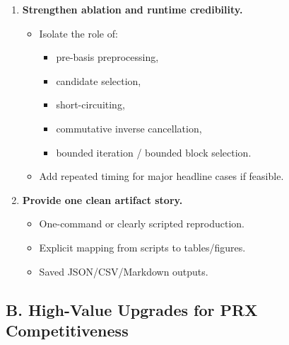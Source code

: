 \documentclass[11pt]{article}
\begin{document}
\begin{enumerate}
    \item \textbf{Strengthen ablation and runtime credibility.}
    \begin{itemize}
        \item Isolate the role of:
        \begin{itemize}
            \item pre-basis preprocessing,
            \item candidate selection,
            \item short-circuiting,
            \item commutative inverse cancellation,
            \item bounded iteration / bounded block selection.
        \end{itemize}
        \item Add repeated timing for major headline cases if feasible.
    \end{itemize}

    \item \textbf{Provide one clean artifact story.}
    \begin{itemize}
        \item One-command or clearly scripted reproduction.
        \item Explicit mapping from scripts to tables/figures.
        \item Saved JSON/CSV/Markdown outputs.
    \end{itemize}
\end{enumerate}

\subsection{B. High-Value Upgrades for PRX Competitiveness}
\end{document}
